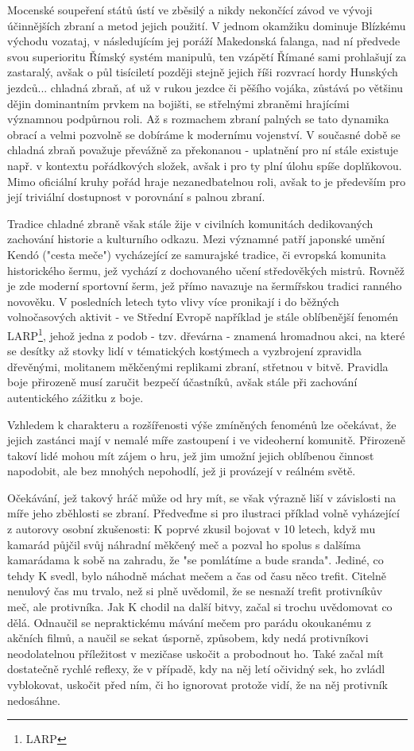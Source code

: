 Mocenské soupeření států ústí ve zběsilý a nikdy nekončící závod ve vývoji účinnějších zbraní a metod jejich použití. V jednom okamžiku dominuje Blízkému východu vozataj, v následujícím jej poráží Makedonská falanga, nad ní předvede svou superioritu Římský systém manipulů, ten vzápětí Římané sami prohlašují za zastaralý, avšak o půl tisíciletí později stejně jejich říši rozvrací hordy Hunských jezdců... chladná zbraň, ať už v rukou jezdce či pěšího vojáka, zůstává po většinu dějin dominantním prvkem na bojišti, se střelnými zbraněmi hrajícími významnou podpůrnou roli. Až s rozmachem zbraní palných se tato dynamika obrací a velmi pozvolně se dobíráme k modernímu vojenství. V současné době se chladná zbraň považuje převážně za překonanou - uplatnění pro ní stále existuje např. v kontextu pořádkových složek, avšak i pro ty plní úlohu spíše doplňkovou. Mimo oficiální kruhy pořád hraje nezanedbatelnou roli, avšak to je především pro její triviální dostupnost v porovnání s palnou zbraní.

Tradice chladné zbraně však stále žije v civilních komunitách dedikovaných zachování historie a kulturního odkazu. Mezi významné patří japonské umění Kendó ("cesta meče") vycházející ze samurajské tradice, či evropská komunita historického šermu, jež vychází z dochovaného učení středověkých mistrů. Rovněž je zde moderní sportovní šerm, jež přímo navazuje na šermířskou tradici ranného novověku. V posledních letech tyto vlivy více pronikají i do běžných volnočasových aktivit - ve Střední Evropě například je stále oblíbenější fenomén LARP\footnote{\ac{LARP}}, jehož jedna z podob - tzv. dřevárna - znamená hromadnou akci, na které se desítky až stovky lidí v tématických kostýmech a vyzbrojení zpravidla dřevěnými, molitanem měkčenými replikami zbraní, střetnou v bitvě. Pravidla boje přirozeně musí zaručit bezpečí účastníků, avšak stále při zachování autentického zážitku z boje.  

Vzhledem k charakteru a rozšířenosti výše zmíněných fenoménů lze očekávat, že jejich zastánci mají v nemalé míře zastoupení i ve videoherní komunitě. Přirozeně takoví lidé mohou mít zájem o hru, jež jim umožní jejich oblíbenou činnost napodobit, ale bez mnohých nepohodlí, jež ji provázejí v reálném světě.

Očekávání, jež takový hráč může od hry mít, se však výrazně liší v závislosti na míře jeho zběhlosti se zbraní. Předveďme si pro ilustraci příklad volně vyházející z autorovy osobní zkušenosti:
K poprvé zkusil bojovat v 10 letech, když mu kamarád půjčil svůj náhradní měkčený meč a pozval ho spolus s dalšíma kamarádama k sobě na zahradu, že "se pomlátíme a bude sranda". Jediné, co tehdy K svedl, bylo náhodně máchat mečem a čas od času něco trefit. Citelně nenulový čas mu trvalo, než si plně uvědomil, že se nesnaží trefit protivníkův meč, ale protivníka. 
Jak K chodil na další bitvy, začal si trochu uvědomovat co dělá. Odnaučil se nepraktickému mávání mečem pro parádu okoukanému z akčních filmů, a naučil se sekat úsporně, způsobem, kdy nedá protivníkovi neodolatelnou příležitost v mezičase uskočit a probodnout ho. Také začal mít dostatečně rychlé reflexy, že v případě, kdy na něj letí očividný sek, ho zvládl vyblokovat, uskočit před ním, či ho ignorovat protože vidí, že na něj protivník nedosáhne.

